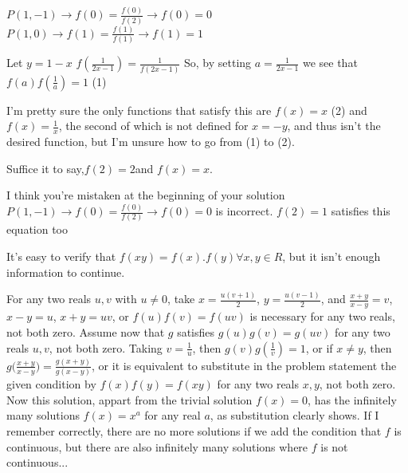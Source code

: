 \begin{solution}
	\begin{tcolorbox}$ P(1, - 1) \rightarrow f(0) = \frac {f(0)}{f(2)} \rightarrow f(0) = 0$
$ P(1,0) \rightarrow f(1) = \frac {f(1)}{f(1)} \rightarrow f(1) = 1$

Let $ y = 1 - x$
$ f(\frac {1}{2x - 1}) = \frac {1}{f(2x - 1)}$
So, by setting $ a = \frac {1}{2x - 1}$ we see that $  f(a)f (\frac {1}{a} ) = 1 $ (1)

I'm pretty sure the only functions that satisfy this are $ f(x) = x$ (2) and $ f(x) = \frac {1}{x}$, the second of which is not defined for $ x = - y$, and thus isn't the desired function, but I'm unsure how to go from (1) to (2).

Suffice it to say,$ f(2) = 2$and $ f(x) = x$.\end{tcolorbox}

I think you're mistaken at the beginning of your solution
$ P(1, - 1) \rightarrow f(0) = \frac {f(0)}{f(2)} \rightarrow f(0) = 0$ is incorrect. $ f(2) = 1$ satisfies this equation too

It's easy to verify that $ f(xy) = f(x).f(y) \forall x,y \in R$, but it isn't enough information to continue.
\end{solution}



\begin{solution}
	For any two reals $ u,v$ with $ u\neq0$, take $ x=\frac{u(v+1)}{2}$, $ y=\frac{u(v-1)}{2}$, and $ \frac{x+y}{x-y}=v$, $ x-y=u$, $ x+y=uv$, or $ f(u)f(v)=f(uv)$ is necessary for any two reals, not both zero.  Assume now that $ g$ satisfies $ g(u)g(v)=g(uv)$ for any two reals $ u,v$, not both zero.  Taking $ v=\frac{1}{u}$, then $ g(v)g(\frac{1}{v})=1$, or if $ x\neq y$, then ${ g(\frac{x+y}{x-y}})=\frac{g(x+y)}{g(x-y)}$, or it is equivalent to substitute in the problem statement the given condition by $ f(x)f(y)=f(xy)$ for any two reals $ x,y$, not both zero.  Now this solution, appart from the trivial solution $ f(x)=0$, has the infinitely many solutions $ f(x)=x^a$ for any real $ a$, as substitution clearly shows.  If I remember correctly, there are no more solutions if we add the condition that $ f$ is continuous, but there are also infinitely many solutions where $ f$ is not continuous...
\end{solution}



